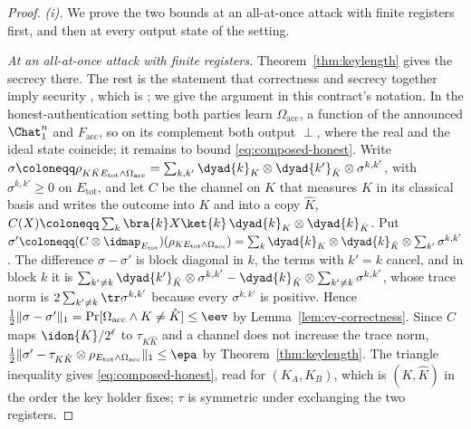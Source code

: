 \begin{proof}
\emph{(i).} We prove the two bounds at an all-at-once attack with finite
registers first, and then at every output state of the setting.

\emph{At an all-at-once attack with finite registers.} Theorem~\ref{thm:keylength}
gives the secrecy there. The rest is the statement that correctness and secrecy together imply
security \cite[Sec.~2.3.1, Thm.~2.1]{tupkary2025survey}, which is
\cite[Sec.~III.B.3, Thm.~2]{portmann2022security}; we give the argument in
this contract's notation. In the honest-authentication setting both parties
learn $\Omega_{\mathrm{acc}}$, a function of the announced $\Chat_1^n$ and
$F_{\mathrm{acc}}$, so on its complement both output $\perp$, where the real
and the ideal state coincide; it remains to bound
\eqref{eq:composed-honest}. Write
$\sigma\coloneqq\rho_{K\hat K E_{\mathrm{tot}}\wedge\Omega_{\mathrm{acc}}}
=\sum_{k,k'}\dyad{k}_K\otimes\dyad{k'}_{\hat K}\otimes\sigma^{k,k'}$, with
$\sigma^{k,k'}\ge0$ on $E_{\mathrm{tot}}$, and let $C$ be the channel on $K$
that measures $K$ in its classical basis and writes the outcome into $K$ and
into a copy $\hat K$, $C(X)\coloneqq\sum_k\bra{k}X\ket{k}\,
\dyad{k}_K\otimes\dyad{k}_{\hat K}$. Put
$\sigma'\coloneqq(C\otimes\idmap_{E_{\mathrm{tot}}})
(\rho_{K E_{\mathrm{tot}}\wedge\Omega_{\mathrm{acc}}})
=\sum_{k}\dyad{k}_K\otimes\dyad{k}_{\hat K}\otimes\sum_{k'}\sigma^{k,k'}$.
The difference $\sigma-\sigma'$ is block diagonal in $k$, the terms with
$k'=k$ cancel, and in block $k$ it is
$\sum_{k'\ne k}\dyad{k'}_{\hat K}\otimes\sigma^{k,k'}
-\dyad{k}_{\hat K}\otimes\sum_{k'\ne k}\sigma^{k,k'}$, whose trace norm is
$2\sum_{k'\ne k}\tr\sigma^{k,k'}$ because every $\sigma^{k,k'}$ is positive.
Hence
$\frac12\|\sigma-\sigma'\|_1=\Pr[\Omega_{\mathrm{acc}}\wedge K\ne\hat K]
\le\eev$ by Lemma~\ref{lem:ev-correctness}. Since $C$ maps
$\idon{K}/2^{\ell}$ to $\tau_{K\hat K}$ and a channel does not increase the
trace norm,
$\frac12\|\sigma'-\tau_{K\hat K}\otimes
\rho_{E_{\mathrm{tot}}\wedge\Omega_{\mathrm{acc}}}\|_1\le\epa$ by
Theorem~\ref{thm:keylength}. The triangle inequality gives
\eqref{eq:composed-honest}, read for $(K_A,K_B)$, which is $(K,\hat K)$ in
the order the key holder fixes; $\tau$ is symmetric under exchanging the two
registers.


\end{proof}
